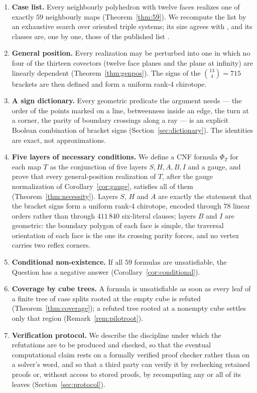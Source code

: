 \documentclass[11pt,reqno]{amsart}
\theoremstyle{plain}
\theoremstyle{definition}
\begin{document}
\begin{enumerate}[label=(\arabic*),leftmargin=2.2em]
\item \textbf{Case list.} Every neighbourly polyhedron with twelve faces realizes one of exactly $59$
   neighbourly maps (Theorem~\ref{thm:59}). We recompute the list by an exhaustive search
   over oriented triple systems; its size agrees with \cite{AltshulerBokowskiSchuchert1996}, and
   its classes are, one by one, those of the published list \cite{LutzManifoldPage}.
\item \textbf{General position.} Every realization may be perturbed into one in which no four of the
   thirteen covectors (twelve face planes and the plane at infinity) are linearly dependent
   (Theorem~\ref{thm:genpos}). The signs of the $\binom{13}{4}=715$ brackets are then defined and form a
   uniform rank-$4$ chirotope.
\item \textbf{A sign dictionary.} Every geometric predicate the argument needs --- the order of the
   points marked on a line, betweenness inside an edge, the
   turn at a corner, the parity of boundary crossings along a ray --- is an explicit Boolean
   combination of bracket signs (Section~\ref{sec:dictionary}). The identities are exact, not
   approximations.
\item \textbf{Five layers of necessary conditions.} We define a CNF formula $\Phi_T$ for each map $T$
   as the conjunction of five layers $S,H,A,B,I$ and a gauge, and prove that every general-position
   realization of $T$, after the gauge normalization of Corollary~\ref{cor:gauge}, satisfies all of
   them (Theorem~\ref{thm:necessity}). Layers $S$, $H$ and $A$ are
   exactly the statement that the bracket signs form a uniform rank-$4$ chirotope, encoded through
   $78$ linear orders rather than through $411\,840$ six-literal clauses; layers $B$ and $I$ are
   geometric: the boundary polygon of each face is simple, the traversal orientation of each face is
   the one its crossing parity forces, and no vertex carries two reflex corners.
\item \textbf{Conditional non-existence.} If all $59$ formulas are unsatisfiable, the Question has a
   negative answer (Corollary~\ref{cor:conditional}).
\item \textbf{Coverage by cube trees.} A formula is unsatisfiable as soon as every leaf of a finite
   tree of case splits rooted at the empty cube is refuted (Theorem~\ref{thm:coverage}); a refuted
   tree rooted at a nonempty cube settles only that region (Remark~\ref{rem:pilotroot}).
\item \textbf{Verification protocol.} We describe the discipline under which the refutations are to be
   produced and checked, so that the eventual computational claim rests on a formally verified proof
   checker \cite{TanHeuleMyreen2023} rather than on a solver's word, and so that a third party can
   verify it by rechecking retained proofs or, without access to stored proofs, by recomputing any
   or all of its leaves (Section~\ref{sec:protocol}).
\end{enumerate}
\end{document}
